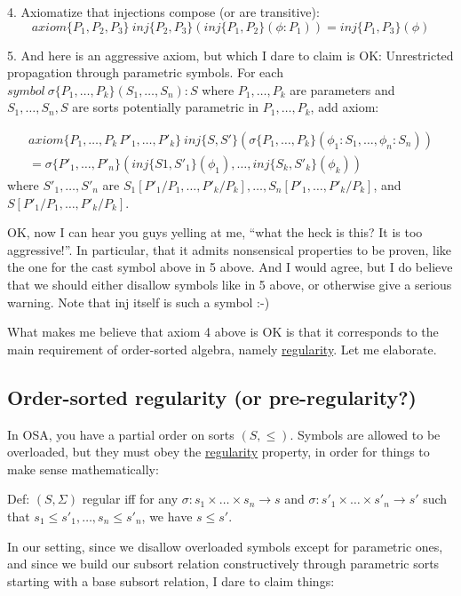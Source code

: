 \documentclass[UTF8,11pt]{article}
\theoremstyle{plain}
\theoremstyle{definition}
\theoremstyle{remark}
\begin{document}
4. Axiomatize that injections compose (or are transitive):
\[axiom\{P_1,P_2,P_3\} \ inj\{P_2,P_3\}(inj\{P_1,P_2\}(\phi:P_1))=inj\{P_1,P_3\}(\phi)\]

5. And here is an aggressive axiom, but which I dare to claim is OK: Unrestricted propagation through parametric symbols. For each $symbol\ \sigma\{P_1,\dots,P_k\}(S_1,\dots,S_n):S$ where $P_1, \dots,P_k$ are parameters and $S_1,\dots,S_n,S$ are sorts potentially parametric in $P_1, \dots,P_k$, add axiom:

\begin{align*}
axiom\{P_1, \dots,P_k\,P'_1,\dots,P'_k\} \ inj\{S,S'\}(\sigma\{P_1,\dots,P_k\}(\phi_1:S_1,\dots,\phi_n:S_n))\\=\sigma\{P'_1,\dots,P'_n\}(inj\{S1,S'_1\}(\phi_1),\dots,inj\{S_k,S'_k\}(\phi_k))
\end{align*}
where $S'_1,\dots,S'_n$ are $S_1[P'_1/P_1,\dots,P'_k/P_k],\dots,S_n[P'_1,\dots,P'_k/P_k]$, and $S[P'_1/P_1,\dots,P'_k/P_k]$.

OK, now I can hear you guys yelling at me, ``what the heck is this? It is too aggressive!''. In particular, that it admits nonsensical properties to be proven, like the one for the cast symbol above in 5 above. And I would agree, but I do believe that we should either disallow symbols like in 5 above, or otherwise give a serious warning. Note that inj itself is such a symbol :-)

What makes me believe that axiom 4 above is OK is that it corresponds to the main requirement of order-sorted algebra, namely \underline{regularity}. Let me elaborate.


\subsection{Order-sorted regularity (or pre-regularity?)}

In OSA, you have a partial order on sorts $(S,\le)$. Symbols are allowed to be overloaded, but they must obey the \underline{regularity} property, in order for things to make sense mathematically:

Def: $(S,\Sigma)$ regular iff for any $\sigma:s_1\times \dots \times s_n\rightarrow s$ and $\sigma:s'_1\times \dots \times s'_n\rightarrow s'$ such that $s_1 \le s'_1, \dots, s_n \le s'_n$, we have $s \le s'$.

In our setting, since we disallow overloaded symbols except for parametric ones, and since we build our subsort relation constructively through parametric sorts starting with a base subsort relation, I dare to claim things:
\end{document}
